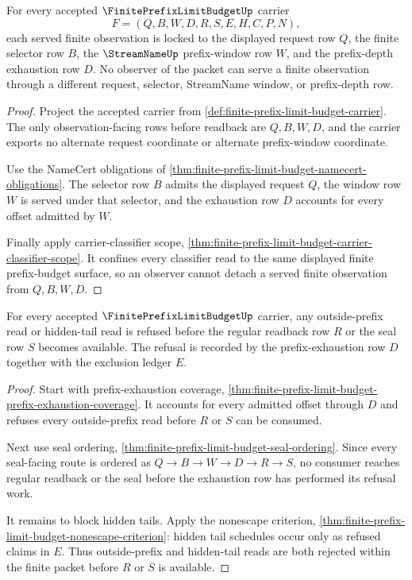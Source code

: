 \begin{theorem}
\label{thm:finite-prefix-limit-budget-observer-lock}
For every accepted $\FinitePrefixLimitBudgetUp$ carrier
$$
F=(Q,B,W,D,R,S,E,H,C,P,N),
$$
each served finite observation is locked to the displayed request row $Q$, the finite selector row $B$, the $\StreamNameUp$ prefix-window row $W$, and the prefix-depth exhaustion row $D$. No observer of the packet can serve a finite observation through a different request, selector, StreamName window, or prefix-depth row.
\end{theorem}
\begin{proof}
Project the accepted carrier from \autoref{def:finite-prefix-limit-budget-carrier}. The only observation-facing rows before readback are $Q,B,W,D$, and the carrier exports no alternate request coordinate or alternate prefix-window coordinate.

Use the NameCert obligations of \autoref{thm:finite-prefix-limit-budget-namecert-obligations}. The selector row $B$ admits the displayed request $Q$, the window row $W$ is served under that selector, and the exhaustion row $D$ accounts for every offset admitted by $W$.

Finally apply carrier-classifier scope, \autoref{thm:finite-prefix-limit-budget-carrier-classifier-scope}. It confines every classifier read to the same displayed finite prefix-budget surface, so an observer cannot detach a served finite observation from $Q,B,W,D$.
\end{proof}

\begin{theorem}
\label{thm:finite-prefix-limit-budget-tail-refusal}
For every accepted $\FinitePrefixLimitBudgetUp$ carrier, any outside-prefix read or hidden-tail read is refused before the regular readback row $R$ or the seal row $S$ becomes available. The refusal is recorded by the prefix-exhaustion row $D$ together with the exclusion ledger $E$.
\end{theorem}
\begin{proof}
Start with prefix-exhaustion coverage, \autoref{thm:finite-prefix-limit-budget-prefix-exhaustion-coverage}. It accounts for every admitted offset through $D$ and refuses every outside-prefix read before $R$ or $S$ can be consumed.

Next use seal ordering, \autoref{thm:finite-prefix-limit-budget-seal-ordering}. Since every seal-facing route is ordered as $Q \to B \to W \to D \to R \to S$, no consumer reaches regular readback or the seal before the exhaustion row has performed its refusal work.

It remains to block hidden tails. Apply the nonescape criterion, \autoref{thm:finite-prefix-limit-budget-nonescape-criterion}: hidden tail schedules occur only as refused claims in $E$. Thus outside-prefix and hidden-tail reads are both rejected within the finite packet before $R$ or $S$ is available.
\end{proof}

